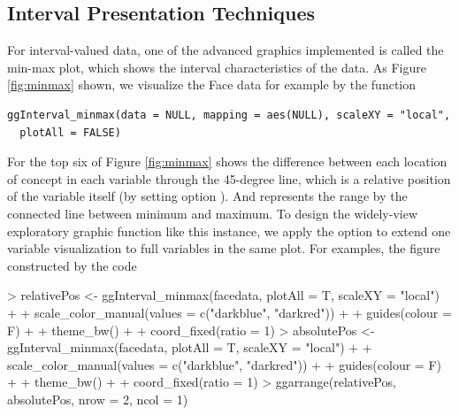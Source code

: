 \documentclass[article]{jss}
\begin{document}

\subsection{Interval Presentation Techniques}

For interval-valued data, one of the advanced graphics implemented is called the min-max plot, which shows the interval characteristics of the data. As Figure \ref{fig:minmax} shown, we visualize the Face data for example by the function 

\begin{verbatim}
ggInterval_minmax(data = NULL, mapping = aes(NULL), scaleXY = "local",
  plotAll = FALSE)
\end{verbatim}

For the top six of Figure \ref{fig:minmax} shows the difference between each location of concept in each variable through the 45-degree line, which is a relative position of the variable itself (by setting option ). And represents the range by the connected line between minimum and maximum. To design the widely-view exploratory graphic function like this instance, we apply the option  to extend one variable visualization to full variables in the same plot. For examples, the figure constructed by the code

\begin{Schunk}
\begin{Sinput}
> relativePos <- ggInterval_minmax(facedata, plotAll = T, scaleXY = "local") +
+                scale_color_manual(values = c("darkblue", "darkred")) +
+                guides(colour = F) + 
+                theme_bw() + 
+                coord_fixed(ratio = 1)
> absolutePos <- ggInterval_minmax(facedata, plotAll = T, scaleXY = "local") +
+                scale_color_manual(values = c("darkblue", "darkred")) +
+                guides(colour = F) + 
+                theme_bw() + 
+                coord_fixed(ratio = 1)
> ggarrange(relativePos, absolutePos, nrow = 2, ncol = 1)
\end{Sinput}
\end{Schunk}
\end{document}
